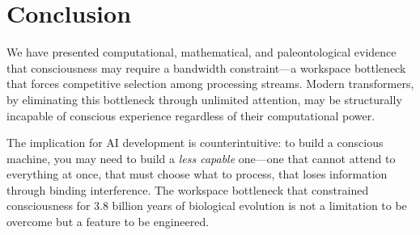 \documentclass[10pt,letterpaper]{article}
\begin{document}
\section*{Conclusion}

We have presented computational, mathematical, and paleontological
evidence that consciousness may require a bandwidth constraint---a
workspace bottleneck that forces competitive selection among processing
streams. Modern transformers, by eliminating this bottleneck through
unlimited attention, may be structurally incapable of conscious
experience regardless of their computational power.

The implication for AI development is counterintuitive: to build a
conscious machine, you may need to build a \emph{less capable} one---one
that cannot attend to everything at once, that must choose what to
process, that loses information through binding interference. The
workspace bottleneck that constrained consciousness for 3.8 billion
years of biological evolution is not a limitation to be overcome but a
feature to be engineered.
\end{document}
